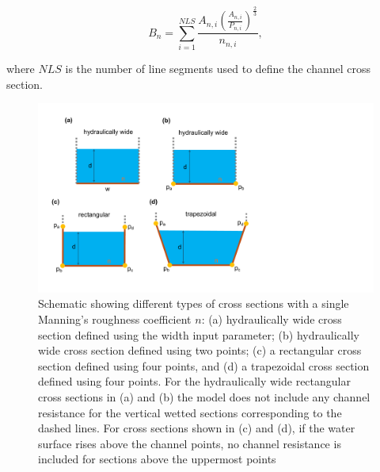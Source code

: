 \documentclass[fleqn]{article}
\begin{document}
\begin{equation}
  B_n = \sum_{i=1}^{NLS} \frac{A_{n,i} \left ( \frac {A_{n,i}}{P_{n,i}}\right )^{\frac{2}{3}}}{n_{n,i}},
\end{equation}

\noindent where $NLS$ is the number of line segments used to define the channel cross section.

\begin{figure}
	\centering
	\includegraphics[scale=0.5]{figures/cxs.pdf}
	\caption[Schematic showing different types of channel cross sections with constant roughness.]{Schematic showing different types of cross sections with a single Manning's roughness coefficient $n$: (a) hydraulically wide cross section defined using the width input parameter; (b) hydraulically wide cross section defined using two points; (c) a rectangular cross section defined using four points, and (d) a trapezoidal cross section defined using four points.  For the hydraulically wide rectangular cross sections in (a) and (b) the model does not include any channel resistance for the vertical wetted sections corresponding to the dashed lines.  For cross sections shown in (c) and (d), if the water surface rises above the channel points, no channel resistance is included for sections above the uppermost points}
	\label{fig:cxs}
\end{figure}
\end{document}
